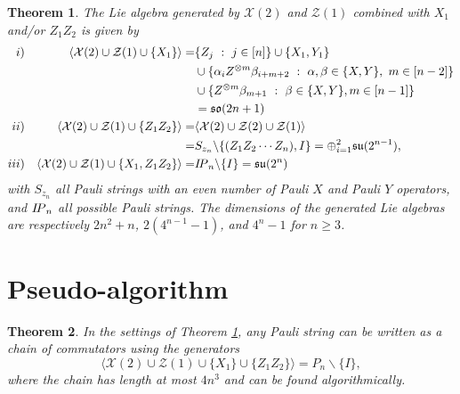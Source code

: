 \documentclass[10pt,a4paper]{amsart}
\newtheorem{theorem}{Theorem}
\newcommand{\PP}{{\rm I\! P}}
\newcommand{\cX}{\mathcal{X}}
\newcommand{\cZ}{\mathcal{Z}}
\newcommand{\mf}[1]{\mathfrak{#1}}
\begin{document}
\begin{theorem}\label{thm:XdoubleZsingle_extensions}
    The Lie algebra generated by $\cX(2)$ and $\cZ(1)$ combined with $X_1$ and/or $Z_1 Z_2$ is given by
    \begin{equation*}
    \begin{aligned}
        i) && \langle \cX(2) \cup \cZ(1) \cup \{X_1\} \rangle =& \{Z_j ~:~ j \in [n]\} \cup \{X_1, Y_1\} \\ 
        &&& \cup \{\alpha_i Z^{\otimes m} \beta_{i+m+2} ~:~ \alpha, \beta \in \{X,Y\},~ m \in [n-2] \} \\
        &&& \cup \{Z^{\otimes m} \beta_{m+1} ~:~ \beta \in \{X,Y\}, m \in [n-1] \}  \\
        &&& = \mf{so}(2n+1)\\
        ii) && \langle \cX(2) \cup \cZ(1) \cup \{Z_1 Z_2\} \rangle =& \langle \cX(2) \cup \cZ(2) \cup \cZ(1) \rangle  \\
        && =& S_{z_n} \backslash \{(Z_1 Z_2 \cdots Z_n), I\} = \oplus_{i=1}^2 \mf{su}(2^{n-1}), \\
        iii) && \langle \cX(2) \cup \cZ(1) \cup \{X_1, Z_1 Z_2\} \rangle =& \PP_n \backslash \{I \} = \mf{su}(2^n)
    \end{aligned}
    \end{equation*}
    with $S_{z_n}$ all Pauli strings with an even number of Pauli $X$ and Pauli $Y$ operators, and $\PP_n$ all possible Pauli strings. The dimensions of the generated Lie algebras are respectively $2n^2+n$, $2( 4^{n-1}-1)$, and $4^n-1$ for $n\geq 3$.
\end{theorem}

\section{Pseudo-algorithm}\label{app:alg-computation}

\begin{theorem}\label{thm:commutators_algorithmically}
    In the settings of Theorem \ref{thm:XdoubleZsingle_extensions}, any Pauli string can be written as a chain of commutators using the generators
    \begin{equation}
        \langle \cX(2) \cup \cZ(1) \cup \{X_1\} \cup \{Z_1 Z_2\} \rangle = P_n \backslash \{I \},
    \end{equation}
    where the chain has length at most $4n^3$ and can be found algorithmically.
\end{theorem}
\end{document}

